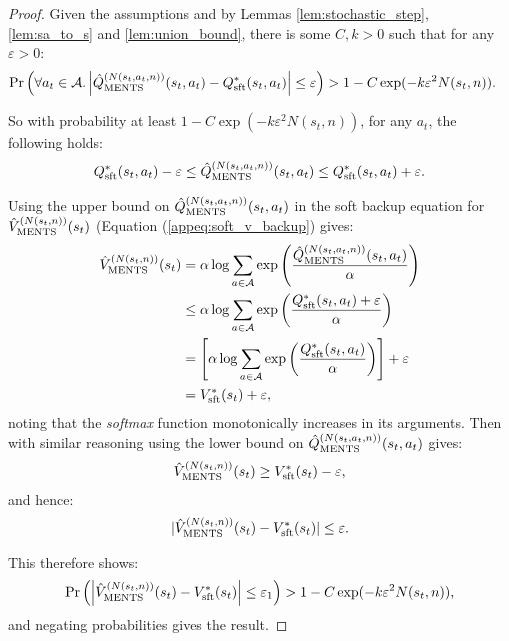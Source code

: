         \begin{proof}
            Given the assumptions and by Lemmas \ref{lem:stochastic_step}, \ref{lem:sa_to_s} and \ref{lem:union_bound}, there is some $C,k>0$ such that for any $\varepsilon>0$:
            \begin{align}
                \Pr\left(\forall a_t\in\mathcal{A}. \left|{\hat{Q}^{(N(s_t,a_t,n))}_{{\textnormal{MENTS}}}}(s_t,a_t)-Q_{{\textnormal{sft}}}^*(s_t,a_t)\right|\leq \varepsilon\right) &> 1-C \exp(-k \varepsilon^2 N(s_t,n)).
            \end{align}
            
            So with probability at least $1-C \exp(-k \varepsilon^2 N(s_t,n))$, for any $a_t$, the following holds:
            \begin{align}
                Q_{{\textnormal{sft}}}^*(s_t,a_t) - \varepsilon \leq {\hat{Q}^{(N(s_t,a_t,n))}_{{\textnormal{MENTS}}}}(s_t,a_t) \leq Q_{{\textnormal{sft}}}^*(s_t,a_t) + \varepsilon. 
            \end{align}
            
            Using the upper bound on ${\hat{Q}^{(N(s_t,a_t,n))}_{{\textnormal{MENTS}}}}(s_t,a_t)$ in the soft backup equation for ${\hat{V}^{(N(s_t,n))}_{{\textnormal{MENTS}}}}(s_t)$ (Equation (\ref{appeq:soft_v_backup}) gives:
            \begin{align}
                {\hat{V}^{(N(s_t,n))}_{{\textnormal{MENTS}}}}(s_t) &= \alpha \log \sum_{a\in\mathcal{A}} 
                        \exp\left(\frac{{\hat{Q}^{(N(s_t,a_t,n))}_{{\textnormal{MENTS}}}}(s_t,a_t)}{\alpha}\right) \\
                    &\leq \alpha \log \sum_{a\in\mathcal{A}} \exp\left(\frac{Q_{{\textnormal{sft}}}^*(s_t,a_t)+\varepsilon}{\alpha}\right) \\
                    &= \left[\alpha \log \sum_{a\in\mathcal{A}} \exp\left(\frac{Q_{{\textnormal{sft}}}^*(s_t,a_t)}{\alpha}\right)\right] 
                        + \varepsilon \\
                    &= V_{{\textnormal{sft}}}^*(s_t) + \varepsilon,
            \end{align}
            noting that the \textit{softmax} function monotonically increases in its arguments. Then with similar reasoning using the lower bound on ${\hat{Q}^{(N(s_t,a_t,n))}_{{\textnormal{MENTS}}}}(s_t,a_t)$ gives:
            \begin{align}
                {\hat{V}^{(N(s_t,n))}_{{\textnormal{MENTS}}}}(s_t) \geq V_{{\textnormal{sft}}}^*(s_t) - \varepsilon,
            \end{align}
            and hence:
            \begin{align}
                |{\hat{V}^{(N(s_t,n))}_{{\textnormal{MENTS}}}}(s_t)-V_{{\textnormal{sft}}}^*(s_t)| \leq \varepsilon.
            \end{align}
            
            This therefore shows: 
            \begin{align}
                \Pr\left(\left|{\hat{V}^{(N(s_t,n))}_{{\textnormal{MENTS}}}}(s_t)-V_{{\textnormal{sft}}}^*(s_t)\right| \leq \varepsilon_1\right) > 1-C \exp(-k \varepsilon^2 N(s_t,n)),
            \end{align}
            and negating probabilities gives the result.
        \end{proof}









